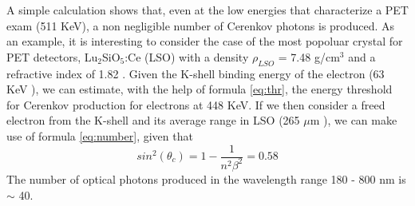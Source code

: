 A simple calculation shows that, even at the low energies that characterize a PET exam (511 KeV), a non negligible number of Cerenkov photons is produced.
As an example, it is interesting to consider the case of the most popoluar crystal for PET detectors, Lu$_{2}$SiO$_{5}$:Ce (LSO) with a density $\rho _{LSO}$ = 7.48 g/cm$^{3}$ and a refractive index of 1.82 \cite{jellison2012}.
Given the K-shell binding energy of the electron (63 KeV \cite{xdata2009}), we can estimate, with the help of formula  \ref{eq:thr}, the energy threshold for Cerenkov production for electrons at 448 KeV.
If we then consider a freed electron from the K-shell and its average range in LSO (265 $\mu$m \cite{nist2005}), we can make use of formula \ref{eq:number}, given that
\begin{equation}
sin ^{2}(\theta _{c}) = 1 - \frac{1}{n^{2}\beta ^{2}} = 0.58
\end{equation}
The number of optical photons produced in the wavelength range 180 - 800 nm is $\sim$ 40.


